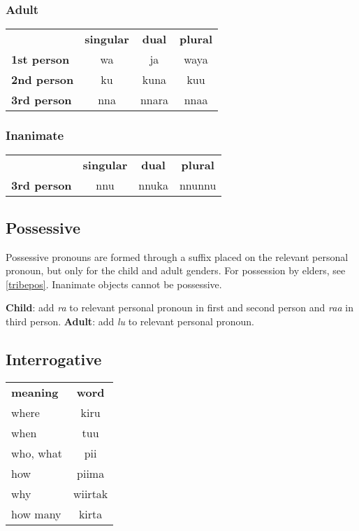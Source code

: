 \documentclass{article}
\begin{document}
\begin{multicols*}{3}
\subsubsection{Adult}
\begin{tabular}{lccc}
 & \textbf{singular} & \textbf{dual} & \textbf{plural}\\
 \textbf{1st person} & wa & ja & waya\\
 \textbf{2nd person} & ku & kuna & kuu\\
 \textbf{3rd person} & nna & nnara & nnaa\\
\end{tabular}

\subsubsection{Inanimate}
\begin{tabular}{lccc}
 & \textbf{singular} & \textbf{dual} & \textbf{plural}\\
 \textbf{3rd person} & nnu & nnuka & nnunnu\\
\end{tabular}

\subsection{Possessive}

Possessive pronouns are formed through a suffix placed on the relevant personal
pronoun, but only for the child and adult genders. For possession by elders, see
\ref{tribepos}. Inanimate objects cannot be possessive.

\textbf{Child}: add \textit{ra} to relevant personal pronoun in first and second
person and \textit{raa} in third person.
\textbf{Adult}: add \textit{lu} to relevant personal pronoun.

\subsection{Interrogative}
\begin{tabular}{lc}
 \textbf{meaning} & \textbf{word}\\
 where & kiru\\
 when & tuu\\
 who, what & pii\\
 how & piima\\
 why & wiirtak\\
 how many & kirta\\
\end{tabular}


\end{multicols*}
\end{document}
